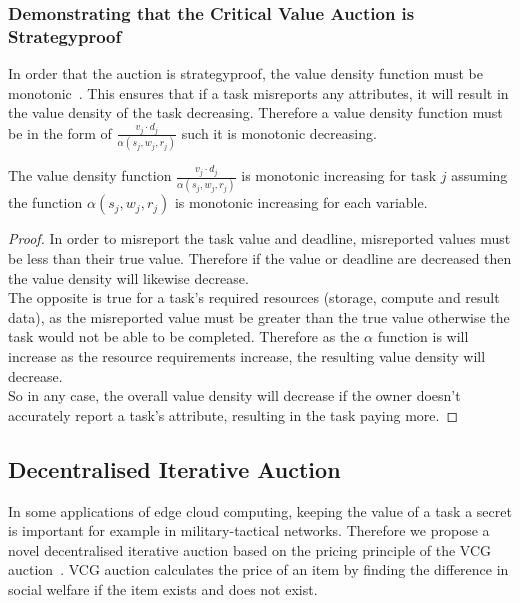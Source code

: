 \subsubsection{Demonstrating that the Critical Value Auction is Strategyproof}
\label{subsubsec:critical-value-auction-strategyproof}
In order that the auction is strategyproof, the value density function must be
monotonic~\cite{nisan2007algorithmic_229_230}. This ensures that if a task misreports any attributes, it will result
in the value density of the task decreasing. Therefore a value density function must be in the form of
$\frac{v_j \cdot d_j}{\alpha(s_j, w_j, r_j)}$ such it is monotonic decreasing.
\begin{theorem}
    The value density function $\frac{v_j \cdot d_j}{\alpha(s_j, w_j, r_j)}$ is monotonic increasing for task $j$ assuming
    the function $\alpha(s_j, w_j, r_j)$ is monotonic increasing for each variable.
\end{theorem}
\begin{proof}
    In order to misreport the task value and deadline, misreported values must be less than their true value. Therefore
    if the value or deadline are decreased then the value density will likewise decrease. \\
    The opposite is true for a task's required resources (storage, compute and result data), as the misreported value
    must be greater than the true value otherwise the task would not be able to be completed. Therefore as the $\alpha$
    function is will increase as the resource requirements increase, the resulting value density will decrease. \\
    So in any case, the overall value density will decrease if the owner doesn't accurately report a task's attribute,
    resulting in the task paying more.
\end{proof}

\subsection{Decentralised Iterative Auction}
\label{subsec:decentralised-iterative-auction}
In some applications of edge cloud computing, keeping the value of a task a secret is important for example in
military-tactical networks. Therefore we propose a novel decentralised iterative auction based on the pricing principle
of the VCG auction~\cite{vickrey,Clarke,groves}. VCG auction calculates the price of an item by finding the
difference in social welfare if the item exists and does not exist.

